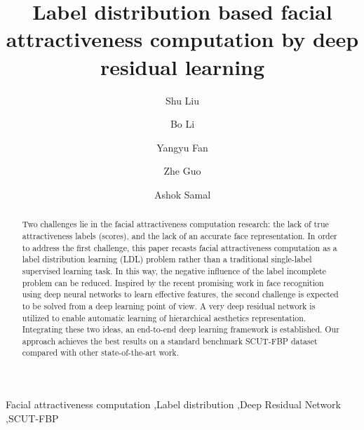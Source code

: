 \documentclass[preprint,5p,times,twocolumn]{elsarticle}
\begin{document}
\begin{frontmatter}


\title{Label distribution based facial attractiveness computation by deep residual learning}

\author[mymainaddress]{Shu Liu}

\author[mymainaddress]{Bo Li}

\author[mymainaddress]{Yangyu Fan}

\author[mymainaddress]{Zhe Guo}

\author[mysecondaryaddress]{Ashok Samal}


\address[mymainaddress]{School of Electronics and Information, Northwestern Polytechnical University, Xi'an, Shaanxi, China}
\address[mysecondaryaddress]{Department of Computer Science and Engineering, University of Nebraska-Lincoln, Lincoln, NE, USA}




\begin{abstract}
Two challenges lie in the facial attractiveness computation research: the lack of true attractiveness labels (scores), and the lack of an accurate face representation. In order to address the first challenge, this paper recasts facial attractiveness computation as a label distribution learning (LDL) problem rather than a traditional single-label supervised learning task. In this way, the negative influence of the label incomplete problem can be reduced. Inspired by the recent promising work in face recognition using deep neural networks to learn effective features, the second challenge is expected to be solved from a deep learning point of view. A very deep residual network is utilized to enable automatic learning of hierarchical aesthetics representation. Integrating these two ideas, an end-to-end deep learning framework is established. Our approach achieves the best results on a standard benchmark SCUT-FBP dataset compared with other state-of-the-art work.
\end{abstract}

\begin{keyword}
Facial attractiveness computation \sep Label distribution \sep Deep Residual Network \sep SCUT-FBP
\end{keyword}

\end{frontmatter}
\end{document}
